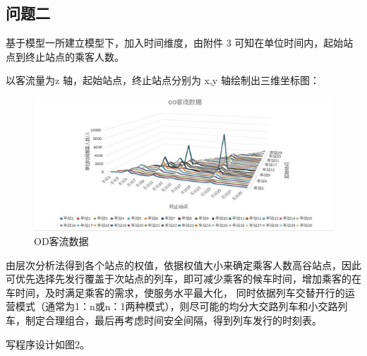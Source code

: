\documentclass[UTF8]{ctexart}
\begin{document}
\subsection{问题二}
基于模型一所建立模型下，加入时间维度，由附件 3 可知在单位时间内，起始站点到终止站点的乘客人数。\par
以客流量为z 轴，起始站点，终止站点分别为 x,y 轴绘制出三维坐标图：\par
\begin{figure}[h]
	\centering
	\includegraphics[scale=0.5]{OD客流数据.png}
	\caption{OD客流数据}
\end{figure}
由层次分析法得到各个站点的权值，依据权值大小来确定乘客人数高谷站点，因此可优先选择先发行覆盖于次站点的列车，即可减少乘客的候车时间，增加乘客的在车时间，及时满足乘客的需求，使服务水平最大化， 同时依据列车交替开行的运营模式（通常为1：n或n：1两种模式），则尽可能的均分大交路列车和小交路列车，制定合理组合，最后再考虑时间安全间隔，得到列车发行的时刻表。\par
写程序设计如图2。\par
\end{document}
